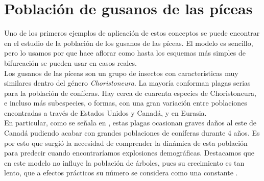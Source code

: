 \section{Población de gusanos de las píceas}
Uno de los primeros ejemplos de aplicación de estos conceptos se puede encontrar en el estudio de la población de los gusanos de las píceas. El modelo es sencillo, pero lo usamos por que hace aflorar como hasta los esquemas más simples de bifurcación se pueden usar en casos reales.\\
Los gusanos de las píceas son un grupo de insectos con características muy similares dentro del género \textit{Choristoneura}. La mayoría conforman plagas serias para la población de coníferas. Hay cerca de cuarenta especies de Choristoneura, e incluso más subespecies, o formas, con una gran variación entre poblaciones encontradas a través de Estados Unidos y Canadá, y en Eurasia. \\
En particular, como se señala en \cite{Strogatz}, estas plagas ocasionan graves daños al este de Canadá pudiendo acabar con grandes poblaciones de coníferas durante 4 años. 
Es por esto que surgió la necesidad de comprender la dinámica de esta población para predecir cuando encontraríamos explosiones demográficas.
Destacamos que en este modelo no influye la población de árboles, pues su crecimiento es tan lento, que a efectos prácticos su número se considera como una constante \cite{ludw}.

